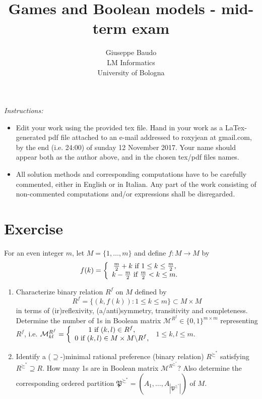 \documentclass{article}
\begin{document}
\title{Games and Boolean models - mid-term exam}
\author{Giuseppe Baudo\\
{\footnotesize LM Informatics}\\
{\footnotesize University  of Bologna}}
\maketitle

{\footnotesize \textsl{Instructions:}
\begin{itemize}
\item Edit your work using the provided tex file. Hand in your work as a LaTex-generated pdf file attached to an e-mail addressed to roxyjean at gmail.com,
by the end (i.e. 24:00) of sunday 12 November 2017. Your name should appear both as the author above, and in the chosen tex/pdf files names.

\item All solution methods and corresponding computations have to be carefully commented, either in English or in Italian. Any part of the work consisting of
non-commented computations and/or expressions shall be disregarded.
\end{itemize}
}

\section{Exercise}
For an even integer $m$, let $M=\{1,\ldots,m\}$ and define $f:M\rightarrow M$ by
$$f(k)=\left\{\begin{array}{c}\frac{m}{2}+k\text{ if }1\leq k\leq\frac{m}{2}\text ,\\ k-\frac{m}{2}\text{ if }\frac{m}{2}<k\leq m\text .\end{array}\right .$$
\begin{enumerate}
\item Characterize binary relation $R^f$ on $M$ defined by
$$R^f=\{(k,f(k)):1\leq k\leq m\}\subset M\times M$$
in terms of (ir)reflexivity, (a/anti)symmetry, transitivity and completeness. Determine the number of 1s in Boolean matrix $\mathcal M^{R^f}\in\{0,1\}^{m\times m}$
representing $R^f$, i.e.
$\mathcal M_{kl}^{R^f}=\left\{\begin{array}{c}1\text{ if }(k,l)\in R^f\text ,\\0\text{ if }(k,l)\in M\times M\backslash R^f\text ,\end{array}\right .$
$1\leq k,l\leq m$.

\item Identify a ($\supseteq$-)minimal rational preference (binary relation) $R^{\succsim^*}$ satisfying $R^{\succsim^*}\supseteq R$. How many 1s are in
Boolean matrix $\mathcal M^{R^{\succsim^*}}$? Also determine the corresponding ordered partition $\mathfrak P^{\succsim^*}=(A_1,\ldots,A_{|\mathfrak P^{\succsim^*}|})$
of $M$.
\end{enumerate}
\end{document}
